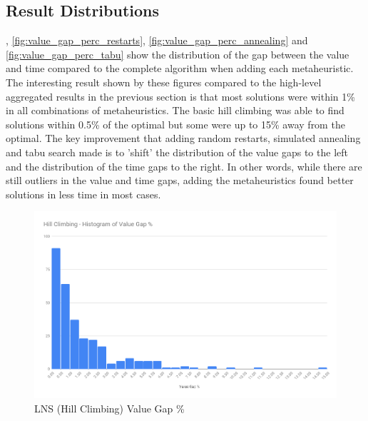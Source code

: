 \subsection{Result Distributions}
\label{subsec:result_distributions}

, \cref{fig:value_gap_perc_restarts}, \cref{fig:value_gap_perc_annealing} and \cref{fig:value_gap_perc_tabu} show the distribution of the gap between the value and time compared to the complete algorithm when adding each metaheuristic. The interesting result shown by these figures compared to the high-level aggregated results in the previous section is that most solutions were within 1\% in all combinations of metaheuristics. The basic hill climbing was able to find solutions within 0.5\% of the optimal but some were up to 15\% away from the optimal. The key improvement that adding random restarts, simulated annealing and tabu search made is to 'shift' the distribution of the value gaps to the left and the distribution of the time gaps to the right. In other words, while there are still outliers in the value and time gaps, adding the metaheuristics found better solutions in less time in most cases.

\begin{figure}[!htbp]
    \centering
    \includegraphics[width=\textwidth]{Figures/Metaheuristics/hill_climb_value_gap.png}
    \caption{LNS (Hill Climbing) Value Gap \%}
    \label{fig:value_gap_perc_hill_climb}
\end{figure}

